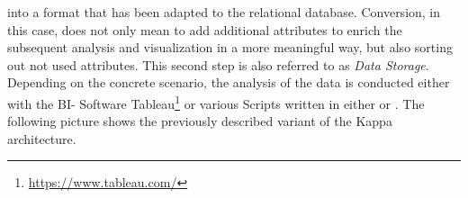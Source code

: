 into a format that has been adapted to the relational database.
Conversion, in this case, does not only mean to add additional attributes to enrich the subsequent analysis and visualization in a more meaningful way,
but also sorting out not used attributes. This second step is also referred to as \textit{Data Storage}.
Depending on the concrete scenario, the analysis of the data is conducted either with the BI- Software Tableau\footnote{\url{https://www.tableau.com/}} or various Scripts written in either  or .
\newline
The following picture shows the previously described variant of the Kappa architecture.
